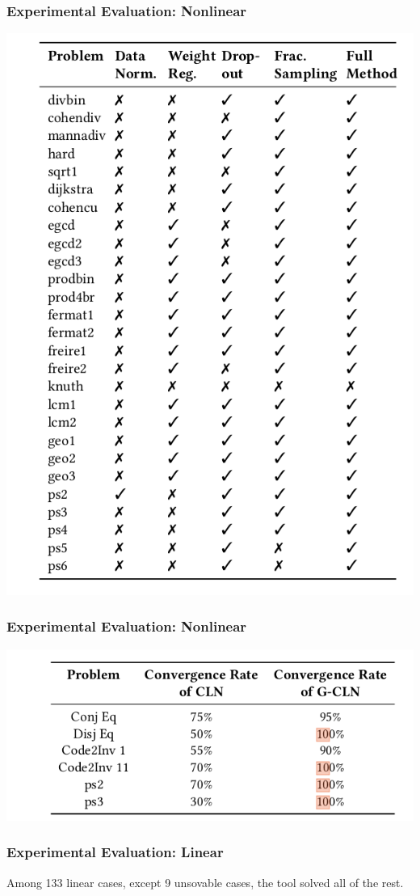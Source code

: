 \documentclass[11pt]{beamer}
\begin{document}
\begin{frame}\frametitle{Experimental Evaluation: Nonlinear}
\begin{center}
\includegraphics[scale=0.3]{13.png}
\end{center}
\end{frame}

\begin{frame}\frametitle{Experimental Evaluation: Nonlinear}
\begin{center}
\includegraphics[scale=0.3]{14.png}
\end{center}
\end{frame}

\begin{frame}\frametitle{Experimental Evaluation: Linear}
Among 133 linear cases, except 9 unsovable cases, the tool solved all of the rest.
\end{frame}
\end{document}
